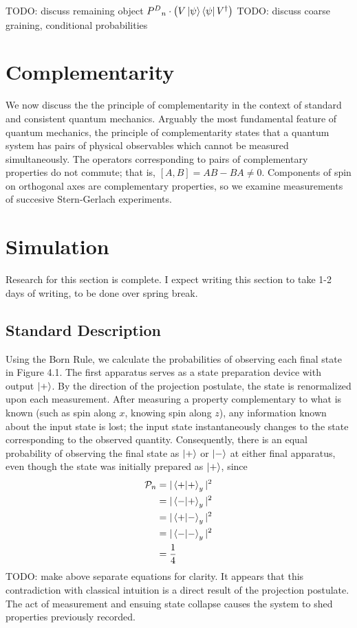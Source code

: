 TODO: discuss remaining object ${P^D}_n \cdot \left(V\ket{\psi}\bra{\psi}V^\dagger\right)$
TODO: discuss coarse graining, conditional probabilities

\chapter{Complementarity}
We now discuss the the principle of complementarity in the context of standard and consistent quantum mechanics. Arguably the most fundamental feature of quantum mechanics, the principle of complementarity states that a quantum system has pairs of physical observables which cannot be measured simultaneously. The operators corresponding to pairs of complementary properties do not commute; that is, $[A,B] = AB - BA \neq 0$. Components of spin on orthogonal axes are complementary properties, so we examine measurements of succesive Stern-Gerlach experiments.

\chapter{Simulation}
Research for this section is complete. I expect writing this section to take 1-2 days of writing, to be done over spring break.

\section{Standard Description}
Using the Born Rule, we calculate the probabilities of observing each final state in Figure 4.1. The first apparatus serves as a state preparation device with output $\ket{+}$. By the direction of the projection postulate, the state is renormalized upon each measurement. After measuring a property complementary to what is known (such as spin along $x$, knowing spin along $z$), any information known about the input state is lost; the input state instantaneously changes to the state corresponding to the observed quantity. Consequently, there is an equal probability of observing the final state as $\ket{+}$ or $\ket{-}$ at either final apparatus, even though the state was initially prepared as $\ket{+}$, since
\begin{align}
    \mathcal{P}_n &= |\braket{+|+}_y|^2 \\
                  &= |\braket{-|+}_y|^2 \\
                  &= |\braket{+|-}_y|^2 \\
                  &= |\braket{-|-}_y|^2 \\
                  &= \frac{1}{4}
\end{align}
TODO: make above separate equations for clarity.
It appears that this contradiction with classical intuition is a direct result of the projection postulate. The act of measurement and ensuing state collapse causes the system to shed properties previously recorded.

